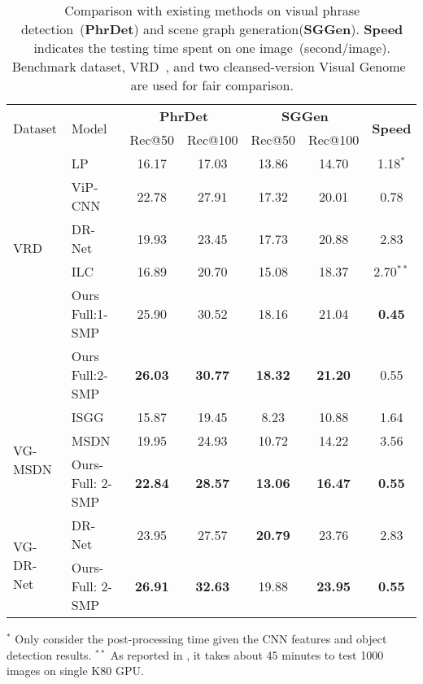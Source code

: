 \documentclass[runningheads]{llncs}
\begin{document}
\begin{table*}[t]
	\renewcommand{\arraystretch}{1.1}
	\setlength{\tabcolsep}{3.pt}
	\small
	\caption{Comparison with existing methods on visual phrase detection~(\textbf{PhrDet}) and scene graph generation(\textbf{SGGen}). \textbf{Speed} indicates the testing time spent on one image~(second/image). Benchmark dataset, VRD~\cite{visual_relationship}, and two cleansed-version Visual Genome~\cite{visual_genome,li2017scene,dai2017detecting} are used for fair comparison.}
	\begin{center}
		\begin{tabularx}{1.0\linewidth}{l | l | cc | cc | c}
		\hline
		\multirow{2}{*}{Dataset} & \multirow{2}{*}{Model} & \multicolumn{2}{c}{\textbf{PhrDet}} \vline & \multicolumn{2}{c}{\textbf{SGGen}} \vline  &  \multirow{2}{*}{\textbf{Speed}} \\
		&& Rec@50 & Rec@100 & Rec@50 & Rec@100 & \\
		\hline
		\multirow{5}{*}{VRD~\cite{visual_relationship}} 
		& LP~\cite{visual_relationship}  & 16.17 & 17.03 & 13.86 & 14.70 & 1.18$^*$\\
		& ViP-CNN~\cite{li2017vip} & 22.78 & 27.91 & 17.32 & 20.01 & 0.78\\
		& DR-Net~\cite{dai2017detecting} & 19.93 & 23.45 & 17.73 & 20.88 & 2.83 \\
		& ILC~\cite{plummer2016phrase} & 16.89 & 20.70 & 15.08 & 18.37 & 2.70$^{**}$\\
& Ours Full:1-SMP & 25.90 & 30.52 & 18.16 & 21.04 & \textbf{0.45}\\
		& Ours Full:2-SMP & \textbf{26.03} & \textbf{30.77} & \textbf{18.32} & \textbf{21.20} & 0.55\\
		\hline
		\multirow{3}{*}{VG-MSDN~\cite{visual_genome,li2017scene}} 
		& ISGG~\cite{xu2017scene} & 15.87 & 19.45 & 8.23  & 	 10.88 & 1.64 \\
		& MSDN~\cite{li2017scene} & 19.95 & 24.93 & 10.72 & 14.22 & 3.56 \\
		& Ours-Full: 2-SMP & \textbf{22.84}  & \textbf{28.57} & \textbf{13.06} & \textbf{16.47} & \textbf{0.55} \\
		\hline
		\multirow{2}{*}{VG-DR-Net~\cite{visual_genome, dai2017detecting}} 
		& DR-Net~\cite{dai2017detecting} & 23.95 & 27.57 & \textbf{20.79} & 23.76 & 2.83\\
		& Ours-Full: 2-SMP & \textbf{26.91} & \textbf{32.63} & 19.88 & \textbf{23.95} & \textbf{0.55} \\
		\hline	
		\end{tabularx}
	\begin{tablenotes}\footnotesize
	$^*$ Only consider the post-processing time given the CNN features and object detection results. $^{**}$ As reported in \cite{plummer2016phrase}, it takes about 45 minutes to test 1000 images on single K80 GPU. 
	\end{tablenotes}
	\end{center}
	\label{tab:comparison}
\end{table*}
\end{document}
